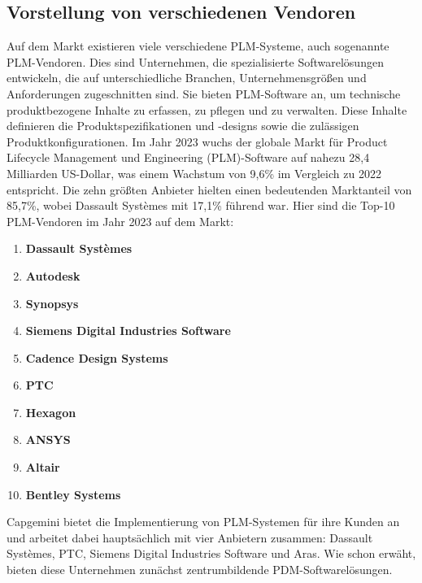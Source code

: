 \subsection{Vorstellung von verschiedenen Vendoren}
Auf dem Markt existieren viele verschiedene PLM-Systeme, auch sogenannte PLM-Vendoren. Dies sind Unternehmen, die spezialisierte Softwarelösungen entwickeln, die auf unterschiedliche Branchen, Unternehmensgrößen und Anforderungen zugeschnitten sind. Sie bieten PLM-Software an, um technische produktbezogene Inhalte zu erfassen, zu pflegen und zu verwalten. Diese Inhalte definieren die Produktspezifikationen und -designs sowie die zulässigen Produktkonfigurationen\cite{PLM1}.
Im Jahr 2023 wuchs der globale Markt für Product Lifecycle Management und Engineering (PLM)-Software auf nahezu 28,4 Milliarden US-Dollar, was einem Wachstum von 9,6\% im Vergleich zu 2022 entspricht. Die zehn größten Anbieter hielten einen bedeutenden Marktanteil von 85,7\%, wobei Dassault Systèmes mit 17,1\% führend war. Hier sind die Top-10 PLM-Vendoren im Jahr 2023 auf dem Markt\cite{Top10PLMVendoren}:
\begin{enumerate}
	\item \textbf{Dassault Systèmes} 
	\item \textbf{Autodesk}
	\item \textbf{Synopsys}
	\item \textbf{Siemens Digital Industries Software}
	\item \textbf{Cadence Design Systems}
	\item \textbf{PTC}
	\item \textbf{Hexagon}
	\item \textbf{ANSYS}
	\item \textbf{Altair}
	\item \textbf{Bentley Systems}
\end{enumerate}
Capgemini bietet die Implementierung von PLM-Systemen für ihre Kunden an und arbeitet dabei hauptsächlich mit vier Anbietern zusammen: Dassault Systèmes, PTC, Siemens Digital Industries Software und Aras. Wie schon erwäht, bieten diese Unternehmen zunächst zentrumbildende PDM-Softwarelösungen.
